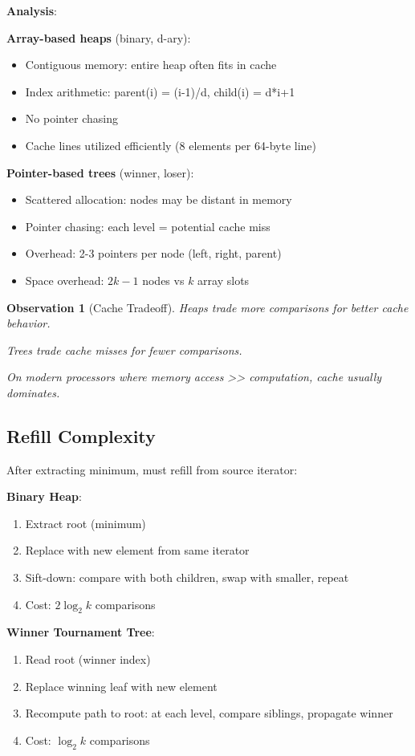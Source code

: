 \documentclass[11pt]{article}
\newtheorem{observation}{Observation}
\begin{document}
\textbf{Analysis}:

\textbf{Array-based heaps} (binary, d-ary):
\begin{itemize}
    \item Contiguous memory: entire heap often fits in cache
    \item Index arithmetic: parent(i) = (i-1)/d, child(i) = d*i+1
    \item No pointer chasing
    \item Cache lines utilized efficiently (8 elements per 64-byte line)
\end{itemize}

\textbf{Pointer-based trees} (winner, loser):
\begin{itemize}
    \item Scattered allocation: nodes may be distant in memory
    \item Pointer chasing: each level = potential cache miss
    \item Overhead: 2-3 pointers per node (left, right, parent)
    \item Space overhead: $2k-1$ nodes vs $k$ array slots
\end{itemize}

\begin{observation}[Cache Tradeoff]
Heaps trade more comparisons for better cache behavior.

Trees trade cache misses for fewer comparisons.

On modern processors where memory access >> computation, cache usually dominates.
\end{observation}

\subsection{Refill Complexity}

After extracting minimum, must refill from source iterator:

\textbf{Binary Heap}:
\begin{enumerate}
    \item Extract root (minimum)
    \item Replace with new element from same iterator
    \item Sift-down: compare with both children, swap with smaller, repeat
    \item Cost: $2 \log_2 k$ comparisons
\end{enumerate}

\textbf{Winner Tournament Tree}:
\begin{enumerate}
    \item Read root (winner index)
    \item Replace winning leaf with new element
    \item Recompute path to root: at each level, compare siblings, propagate winner
    \item Cost: $\log_2 k$ comparisons
\end{enumerate}
\end{document}
